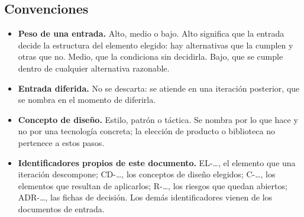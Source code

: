 \subsection{Convenciones}

\begin{itemize}
  \item \textbf{Peso de una entrada.} Alto, medio o bajo. Alto significa que la entrada decide la estructura del elemento elegido: hay alternativas que la cumplen y otras que no. Medio, que la condiciona sin decidirla. Bajo, que se cumple dentro de cualquier alternativa razonable.
  \item \textbf{Entrada diferida.} No se descarta: se atiende en una iteración posterior, que se nombra en el momento de diferirla.
  \item \textbf{Concepto de diseño.} Estilo, patrón o táctica. Se nombra por lo que hace y no por una tecnología concreta; la elección de producto o biblioteca no pertenece a estos pasos.
  \item \textbf{Identificadores propios de este documento.} EL-\ldots, el elemento que una iteración descompone; CD-\ldots, los conceptos de diseño elegidos; C-\ldots, los elementos que resultan de aplicarlos; R-\ldots, los riesgos que quedan abiertos; ADR-\ldots, las fichas de decisión. Los demás identificadores vienen de los documentos de entrada.
\end{itemize}
